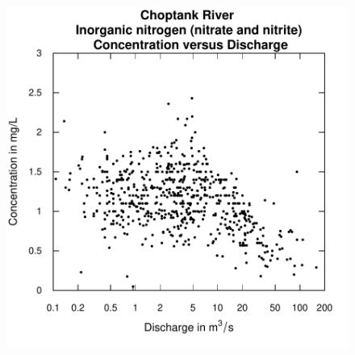 \documentclass[a4paper,11pt]{article}
\begin{document}
\begin{figure}[htbp]
  \begin{minipage}[h]{0.5\linewidth}
    \begin{center}

\includegraphics{EGRET-figplotConcQ}
    \label{fig:plotConcQ}
    \end{center}
  \end{minipage}
  \hspace{0.5cm}
  \begin{minipage}[h]{0.5\linewidth}
    \begin{center}



\end{center}
\end{minipage}
\end{figure}
\end{document}
